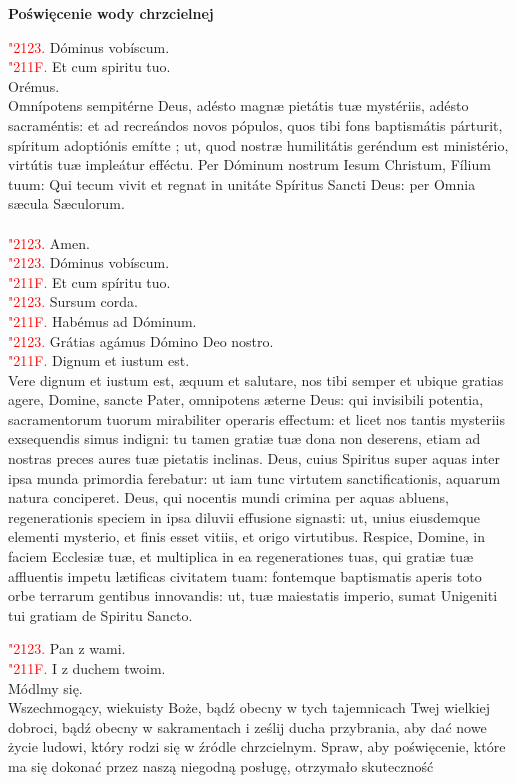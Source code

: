 \documentclass[10pt,a5paper]{book}
\newcommand{\kol}{red}
\newcommand{\textjuni}[1]{{\fontspec{Junicode-Regular}#1}}
\newcommand{\vv}{\textcolor{\kol}{\textjuni{\char"2123. }}}
\newcommand{\rr}{\textcolor{\kol}{\textjuni{\char"211F. }}}
\newcommand{\oremus}[3]{\medskip\centerline{\textbf{#1}}\medskip
	\begin{sloppypar}
		\begin{paracol}{2}
			\setlength{\columnsep}{0em}
			\begin{leftcolumn}
				#2
			\end{leftcolumn}
			\begin{rightcolumn}
				#3
			\end{rightcolumn}
		\end{paracol}
	\end{sloppypar}}
\begin{document}
\oremus{Poświęcenie wody chrzcielnej}{
	\vv Dóminus vobíscum.\\
	\rr Et cum spiritu tuo.\\
	Orémus.\\
	Omnípotens sempitérne Deus, adésto magnæ pietátis tuæ mystériis, adésto
	sacraméntis: et ad recreándos novos pópulos, quos tibi fons baptismátis
	párturit, spíritum adoptiónis emítte ; ut, quod nostræ humilitátis geréndum
	est ministério, virtútis tuæ impleátur efféctu. Per Dóminum nostrum Iesum
	Christum, Fílium tuum: Qui tecum vivit et regnat in unitáte Spíritus Sancti
	Deus: per Omnia s\ae cula S\ae culorum. \\ \\
	\vv Amen.\\
	\vv Dóminus vobíscum.\\
	\rr Et cum spíritu tuo.\\
	\vv Sursum corda.\\
	\rr Habémus ad Dóminum.\\
	\vv Grátias agámus Dómino Deo nostro.\\
	\rr Dignum et iustum est.\\
	Vere dignum et iustum est, æquum et salutare, nos tibi semper et ubique
	gratias agere, Domine, sancte Pater, omnipotens æterne Deus: qui invisibili
	potentia, sacramentorum tuorum mirabiliter operaris effectum: et licet nos
	tantis mysteriis exsequendis simus indigni: tu tamen gratiæ tuæ dona non
	deserens, etiam ad nostras preces aures tuæ pietatis inclinas. Deus, cuius
	Spiritus super aquas inter ipsa munda primordia ferebatur: ut iam tunc
	virtutem sanctificationis, aquarum natura conciperet. Deus, qui nocentis
	mundi crimina per aquas abluens, regenerationis speciem in ipsa diluvii
	effusione signasti: ut, unius eiusdemque elementi mysterio, et finis esset
	vitiis, et origo virtutibus. Respice, Domine, in faciem Ecclesiæ tuæ, et
	multiplica in ea regenerationes tuas, qui gratiæ tuæ affluentis impetu
	lætificas civitatem tuam: fontemque baptismatis aperis toto orbe terrarum
	gentibus innovandis: ut, tuæ maiestatis imperio, sumat Unigeniti tui gratiam
	de Spiritu Sancto.}{\vv Pan z wami.\\
	\rr I z duchem twoim.\\
	Módlmy się.\\
	Wszechmogący, wiekuisty Boże, bądź obecny w tych tajemnicach Twej wielkiej
	dobroci, bądź obecny w sakramentach i ześlij ducha przybrania, aby dać nowe
	życie ludowi, który rodzi się w źródle chrzcielnym. Spraw, aby poświęcenie,
	które ma się dokonać przez naszą niegodną posługę, otrzymało skuteczność
}
\end{document}
